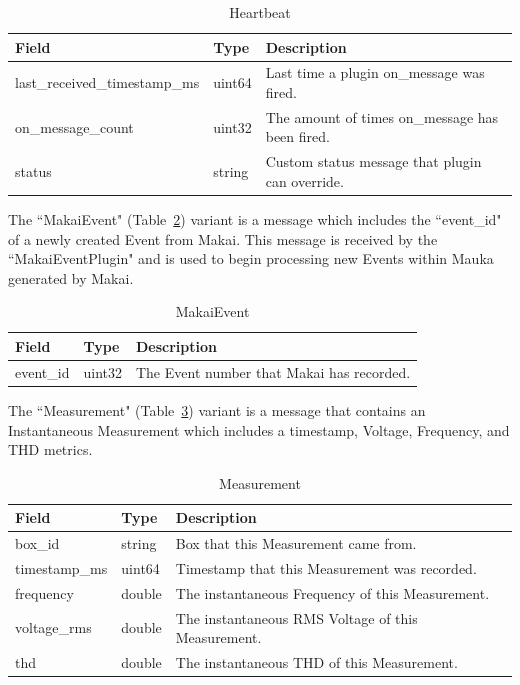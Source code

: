 \begin{table}[H]
	\centering
	\caption{Heartbeat}
	\begin{tabularx}{\textwidth}{llX}
		\toprule
		\textbf{Field} & \textbf{Type} & \textbf{Description} \\
		\midrule
		last\_received\_timestamp\_ms & uint64 & Last time a plugin on\_message was fired.  \\
		on\_message\_count & uint32 & The amount of times on\_message has been fired. \\
		status & string & Custom status message that plugin can override. \\
		\bottomrule
	\end{tabularx}
	\label{table:Heartbeat}
\end{table}

The ``MakaiEvent" (Table~\ref{table:MakaiEvent}) variant is a message which includes the ``event\_id" of a newly created Event from Makai. This message is received by the ``MakaiEventPlugin" and is used to begin processing new Events within Mauka generated by Makai.

\begin{table}[H]
	\centering
	\caption{MakaiEvent}
	\begin{tabularx}{\textwidth}{llX}
		\toprule
		\textbf{Field} & \textbf{Type} & \textbf{Description} \\
		\midrule
		event\_id & uint32 & The Event number that Makai has recorded.  \\
		\bottomrule
	\end{tabularx}
	\label{table:MakaiEvent}
\end{table}

The ``Measurement" (Table~\ref{table:Measurement}) variant is a message that contains an Instantaneous Measurement which includes a timestamp, Voltage, Frequency, and THD metrics.

\begin{table}[H]
	\centering
	\caption{Measurement}
	\begin{tabularx}{\textwidth}{llX}
		\toprule
		\textbf{Field} & \textbf{Type} & \textbf{Description} \\
		\midrule
		box\_id & string  & Box that this Measurement came from. \\
		timestamp\_ms & uint64 & Timestamp that this Measurement was recorded. \\
		frequency & double & The instantaneous Frequency of this Measurement. \\
		voltage\_rms & double & The instantaneous RMS Voltage of this Measurement. \\
		thd & double & The instantaneous THD of this Measurement. \\
		\bottomrule
	\end{tabularx}
	\label{table:Measurement}
\end{table}

